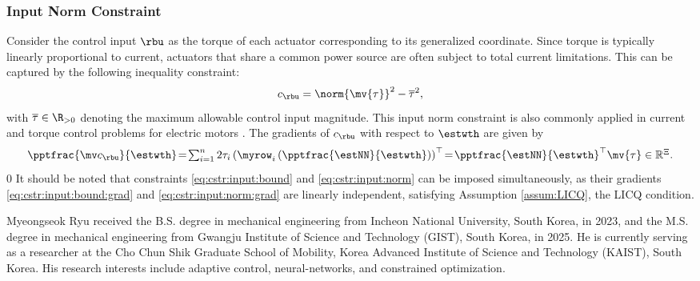 \documentclass[journal]{IEEEtran}
\newcommand*{\template}{template}
\begin{document}
\subsubsection{Input Norm Constraint}\label{sec:appen:cstr:input:norm}

Consider the control input $\rbu$ as the torque of each actuator corresponding to its generalized coordinate. 
Since torque is typically linearly proportional to current, actuators that share a common power source are often subject to total current limitations. This can be captured by the following inequality constraint: 
\begin{equation}
    c_{\rbu}
    =
    \norm{
        \mv{\tau}
    }^2 
    -
    \overline\tau^2
    ,
    \label{eq:cstr:input:norm}
\end{equation}
with $\overline\tau\in\R_{>0}$ denoting the maximum allowable control input magnitude. This input norm constraint is also commonly applied in current and torque control problems for electric motors \cite{Choi:2024aa}.
The gradients of $c_{\rbu}$ with respect to $\estwth$ are given by
\begin{equation}
    \pptfrac{\mv c_{\rbu}}{\estwth}
    \!=\! 
    \textstyle\sum_{i=1}^n 2\tau_{i} 
    \left(
        \myrow_i
        \left(
            \pptfrac{\estNN}{\estwth}
        \right)
    \right)^\top  
    \!=\! 
    {\pptfrac{\estNN}{\estwth}}^\top
    \mv{\tau}
    \in \mathbb R^{\Xi}.
    \label{eq:cstr:input:norm:grad}
\end{equation}0
It should be noted that constraints \eqref{eq:cstr:input:bound} and \eqref{eq:cstr:input:norm} can be imposed simultaneously, as their gradients \eqref{eq:cstr:input:bound:grad} and \eqref{eq:cstr:input:norm:grad} are linearly independent, satisfying Assumption \ref{assum:LICQ}, \ie the LICQ condition.




\begin{IEEEbiography}{Myeongseok Ryu}
    received the B.S. degree in mechanical engineering from Incheon National University, South Korea, in 2023, and the M.S. degree in mechanical engineering from Gwangju Institute of Science and Technology (GIST), South Korea, in 2025. 
    He is currently serving as a researcher at the Cho Chun Shik Graduate School of Mobility, Korea Advanced Institute of Science and Technology (KAIST), South Korea.
    His research interests include adaptive control, neural-networks, and constrained optimization.
\end{IEEEbiography}
\end{document}
